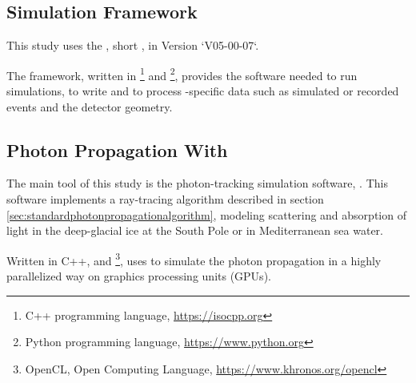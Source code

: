 
\label{sec:tools}

\subsection{\icecube Simulation Framework}

This study uses the , short \icesim, in Version `V05-00-07`.

The framework, written in \footnote{C++ programming language, \url{https://isocpp.org}} and \footnote{Python programming language, \url{https://www.python.org}}, provides the software needed to run simulations, to write and to process \icecube-specific data such as simulated or recorded events and the detector geometry.





\subsection{Photon Propagation With \clsim}

The main tool of this study is the photon-tracking simulation software, \clsim. This software implements a ray-tracing algorithm described in section \ref{sec:standardphotonpropagationalgorithm}, modeling scattering and absorption of light in the deep-glacial ice at the South Pole or in Mediterranean sea water. \cite{clsimreadme}

Written in C++,  and \footnote{OpenCL, Open Computing Language, \url{https://www.khronos.org/opencl}}, \clsim uses  to simulate the photon propagation in a highly parallelized way on graphics processing units (GPUs).

